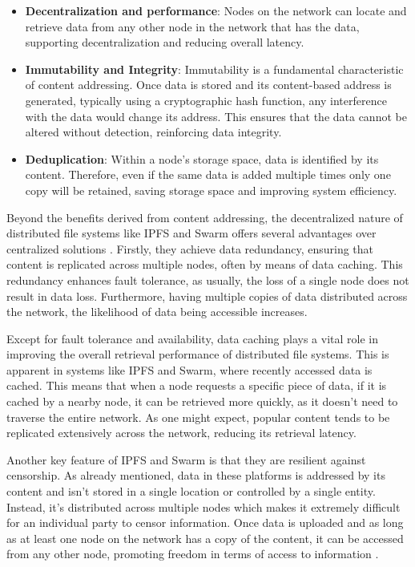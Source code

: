 \begin{itemize}
    \item \textbf{Decentralization and performance}: Nodes on the network can locate and retrieve data from any other node in the network that has the data, supporting decentralization and reducing overall latency.
    \item \textbf{Immutability and Integrity}: Immutability is a fundamental characteristic of content addressing. Once data is stored and its content-based address is generated, typically using a cryptographic hash function, any interference with the data would change its address. This ensures that the data cannot be altered without detection, reinforcing data integrity.
    \item \textbf{Deduplication}: Within a node's storage space, data is identified by its content. Therefore, even if the same data is added multiple times only one copy will be retained, saving storage space and improving system efficiency.
\end{itemize}

Beyond the benefits derived from content addressing, the decentralized nature of distributed file systems like IPFS and Swarm offers several advantages over centralized solutions \citep{daniel_2022, ipfs_docs_1}. Firstly, they achieve data redundancy, ensuring that content is replicated across multiple nodes, often by means of data caching. This redundancy enhances fault tolerance, as usually, the loss of a single node does not result in data loss. Furthermore, having multiple copies of data distributed across the network, the likelihood of data being accessible increases.

Except for fault tolerance and availability, data caching plays a vital role in improving the overall retrieval performance of distributed file systems. This is apparent in systems like IPFS and Swarm, where recently accessed data is cached. This means that when a node requests a specific piece of data, if it is cached by a nearby node, it can be retrieved more quickly, as it doesn't need to traverse the entire network. As one might expect, popular content tends to be replicated extensively across the network, reducing its retrieval latency.

Another key feature of IPFS and Swarm is that they are resilient against censorship. As already mentioned, data in these platforms is addressed by its content and isn't stored in a single location or controlled by a single entity. Instead, it's distributed across multiple nodes which makes it extremely difficult for an individual party to censor information. Once data is uploaded and as long as at least one node on the network has a copy of the content, it can be accessed from any other node, promoting freedom in terms of access to information \citep{IPFS_team_2017}.

